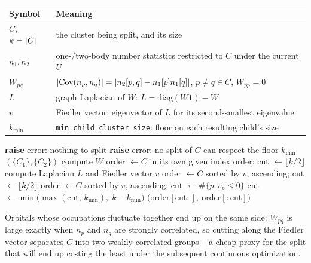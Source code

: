\documentclass[10pt]{article}
\newcommand{\Cov}{\mathrm{Cov}}
\DeclarePairedDelimiter{\abs}{\lvert}{\rvert}
\begin{document}
\begin{center}
\begin{tabular}{ll}
\toprule
Symbol & Meaning \\
\midrule
$C$, $k=\abs{C}$ & the cluster being split, and its size \\
$n_1,n_2$ & one-/two-body number statistics restricted to $C$ under the current $U$ \\
$W_{pq}$ & $\abs{\Cov(n_p,n_q)}=\abs{n_2[p,q]-n_1[p]n_1[q]}$, $p\ne q \in C$, $W_{pp}=0$ \\
$L$ & graph Laplacian of $W$: $L=\mathrm{diag}(W\mathbf{1})-W$ \\
$v$ & Fiedler vector: eigenvector of $L$ for its second-smallest eigenvalue \\
$k_{\min}$ & \texttt{min\_child\_cluster\_size}: floor on each resulting child's size \\
\bottomrule
\end{tabular}
\end{center}

\begin{algorithm}[h]
\caption{\textsc{FiedlerBipartition}$(n_1,n_2,C,k_{\min})$}
\label{alg:fiedler}
\begin{algorithmic}[1]
\small
{} \textbf{raise} error: nothing to split \EndIf
{} \textbf{raise} error: no split of $C$ can respect the floor $k_{\min}$ \EndIf
{} \Return $(\{C_1\},\{C_2\})$ 
\EndIf
\State compute $W$
 
    \State order $\gets C$ in its own given index order; \quad cut $\gets \lfloor k/2\rfloor$
\Else
    \State compute Laplacian $L$ and Fiedler vector $v$
     
        \State order $\gets C$ sorted by $v$, ascending; \quad cut $\gets \lfloor k/2\rfloor$
    \Else
        \State order $\gets C$ sorted by $v$, ascending; \quad cut $\gets \#\{p: v_p\le 0\}$
    \EndIf
\EndIf
\State cut $\gets \min\!\big(\max(\text{cut},\,k_{\min}),\; k-k_{\min}\big)$ 
\State \Return $\big(\text{order}[\text{cut}:],\ \text{order}[:\text{cut}]\big)$
\end{algorithmic}
\end{algorithm}

Orbitals whose occupations fluctuate together end up on the same side: $W_{pq}$ is large exactly
when $n_p$ and $n_q$ are strongly correlated, so cutting along the Fiedler vector separates $C$
into two weakly-correlated groups -- a cheap proxy for the split that will end up costing the
least under the subsequent continuous optimization.
\end{document}
